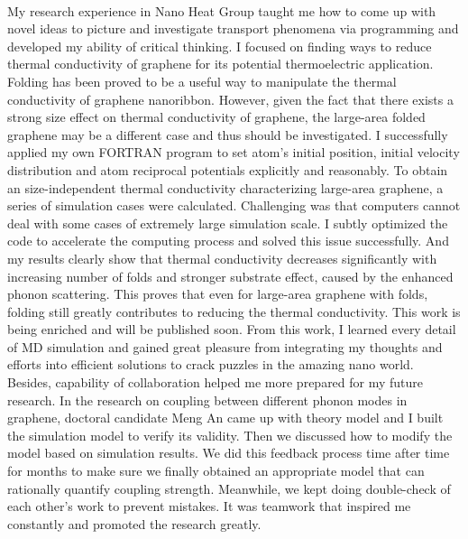 \documentclass[a4paper,10pt]{article}
\begin{document}
\begin{spacing}{1.5}
\\
My research experience in Nano Heat Group taught me how to come up with novel ideas to picture and investigate transport phenomena via programming and developed my ability of critical thinking. I focused on finding ways to reduce thermal conductivity of graphene for its potential thermoelectric application. Folding has been proved to be a useful way to manipulate the thermal conductivity of graphene nanoribbon. However, given the fact that there exists a strong size effect on thermal conductivity of graphene, the large-area folded graphene may be a different case and thus should be investigated. I successfully applied my own FORTRAN program to set atom’s initial position, initial velocity distribution and atom reciprocal potentials explicitly and reasonably. To obtain an size-independent thermal conductivity characterizing large-area graphene, a series of simulation cases were calculated. Challenging was that computers cannot deal with some cases of extremely large simulation scale. I subtly optimized the code to accelerate the computing process and solved this issue successfully. And my results clearly show that thermal conductivity decreases significantly with increasing number of folds and stronger substrate effect, caused by the enhanced phonon scattering. This proves that even for large-area graphene with folds, folding still greatly contributes to reducing the thermal conductivity. This work is being enriched and will be published soon. From this work, I learned every detail of MD simulation and gained great pleasure from integrating my thoughts and efforts into efficient solutions to crack puzzles in the amazing nano world.\\
Besides, capability of collaboration helped me more prepared for my future research. In the research on coupling between different phonon modes in graphene, doctoral candidate Meng An came up with theory model and I built the simulation model to verify its validity. Then we discussed how to modify the model based on simulation results. We did this feedback process time after time for months to make sure we finally obtained an appropriate model that can rationally quantify coupling strength. Meanwhile, we kept doing double-check of each other’s work to prevent mistakes. It was teamwork that inspired me constantly and promoted the research greatly.\\
\\

\end{spacing}
\end{document}
